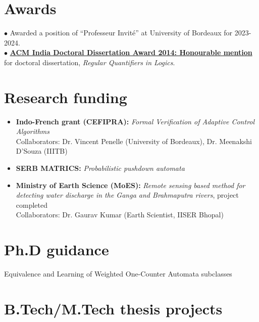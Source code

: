 \documentclass[11pt,a4paper,sans]{moderncv} %
\begin{document}
\section{Awards}
$\bullet$ Awarded a position of ``Professeur Invit\'e'' at University of Bordeaux for 2023-2024. \\
$\bullet$ \href{http://awards.acm.org/award_winners/sreejith_9923861.cfm}{{\textbf{ACM India Doctoral Dissertation Award 2014: Honourable mention}}} for doctoral dissertation, \emph{Regular Quantifiers in Logics}. %


				
\section{Research funding}
\begin{itemize}
 \item \textbf{Indo-French grant (CEFIPRA):} \emph{Formal Verification of Adaptive Control Algorithms} \\
Collaborators: Dr. Vincent Penelle (University of Bordeaux), Dr. Meenakshi D’Souza (IIITB)
\item \textbf{SERB MATRICS:} \emph{Probabilistic pushdown automata}
\item \textbf{Ministry of Earth Science (MoES):} \emph{Remote sensing based method for detecting water discharge in the Ganga and Brahmaputra rivers}, project completed \\
Collaborators: Dr. Gaurav Kumar (Earth Scientist, IISER Bhopal)
\end{itemize}


\section{Ph.D guidance}
 {Equivalence and Learning of Weighted One-Counter Automata subclasses}

\section{B.Tech/M.Tech thesis projects}
\end{document}
